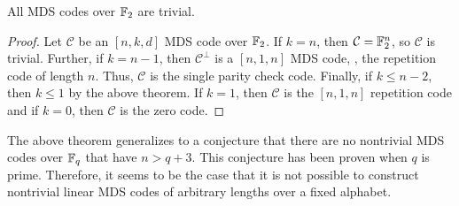\documentclass[../main.tex]{subfiles}
\begin{document}



\begin{corollary}
All MDS codes over $\mathbb{F}_2$ are trivial.
\end{corollary}

\begin{proof}
Let $\mathcal{C}$ be an $[n, k, d]$ MDS code over $\mathbb{F}_2$. If $k = n$, then $\mathcal{C} = \mathbb{F}_2^n$, so $\mathcal{C}$ is trivial. Further, if $k = n - 1$, then $\mathcal{C}^\perp$ is a $[n, 1, n]$ MDS code, \ie, the repetition code of length $n$. Thus, $\mathcal{C}$ is the single parity check code. Finally, if $k \leq n - 2$, then $k \leq 1$ by the above theorem. If $k = 1$, then $\mathcal{C}$ is the $[n, 1, n]$ repetition code and if $k = 0$, then $\mathcal{C}$ is the zero code.
\end{proof}

The above theorem generalizes to a conjecture that there are no nontrivial MDS codes over $\mathbb{F}_q$ that have $n > q + 3$. This conjecture has been proven when $q$ is prime. Therefore, it seems to be the case that it is not possible to construct nontrivial linear MDS codes of arbitrary lengths over a fixed alphabet.



\end{document}
